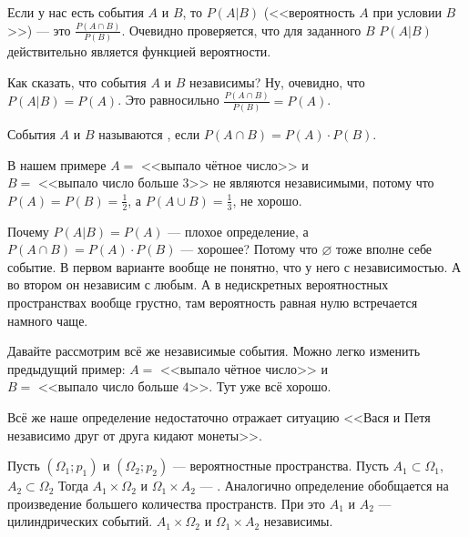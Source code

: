 \documentclass{article}
\begin{document}
\begin{itemize}
\begin{Comment}
        \end{Comment}
        \dfn Если у нас есть события $A$ и $B$, то  $P(A|B)$ (<<вероятность $A$ при условии $B$>>) --- это $\frac{P(A\cap B)}{P(B)}$.
        \thm Очевидно проверяется, что для заданного $B$ $P(A|B)$ действительно является функцией вероятности.
        \begin{Comment}
            Как сказать, что события $A$ и $B$ независимы? Ну, очевидно, что $P(A|B)=P(A)$. Это равносильно $\frac{P(A\cap B)}{P(B)}=P(A)$.
        \end{Comment}
        \dfn События $A$ и $B$ называются , если $P(A\cap B)=P(A)\cdot P(B)$.
        \begin{Example}
            В нашем примере $A=\text{ <<выпало чётное число>>}$ и $B=\text{ <<выпало число больше 3>>}$ не являются независимыми, потому что $P(A)=P(B)=\frac12$, а $P(A\cup B)=\frac13$, не хорошо.
        \end{Example}
        \begin{Comment}
            Почему $P(A|B)=P(A)$ --- плохое определение, а $P(A\cap B)=P(A)\cdot P(B)$ --- хорошее? Потому что $\varnothing$ тоже вполне себе событие. В первом варианте вообще не понятно, что у него с независимостью. А во втором он независим с любым. А в недискретных вероятностных пространствах вообще грустно, там вероятность равная нулю встречается намного чаще.
        \end{Comment}
        \begin{Example}
            Давайте рассмотрим всё же независимые события. Можно легко изменить предыдущий пример: $A=\text{ <<выпало чётное число>>}$ и $B=\text{ <<выпало число больше 4>>}$. Тут уже всё хорошо.
        \end{Example}
        \begin{Comment}
            Всё же наше определение недостаточно отражает ситуацию <<Вася и Петя независимо друг от друга кидают монеты>>.
        \end{Comment}
        \dfn Пусть $(\Omega_1;p_1)$ и $(\Omega_2;p_2)$ --- вероятностные пространства. Пусть $A_1\subset\Omega_1$, $A_2\subset\Omega_2$ Тогда $A_1\times\Omega_2$ и $\Omega_1\times A_2$ --- . Аналогично определение обобщается на произведение большего количества пространств. При это $A_1$ и $A_2$ ---  цилиндрических событий.
        \thm $A_1\times\Omega_2$ и $\Omega_1\times A_2$ независимы.
        \begin{Proof}

\end{Proof}
\end{itemize}
\end{document}
